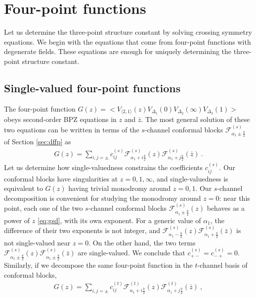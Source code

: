 \documentclass[12pt, a4paper]{article}
\theoremstyle{break}
\begin{document}
\section{Four-point functions}\label{sec:4pt}

Let us determine the three-point structure constant by solving crossing symmetry equations. We begin with the equations that come from four-point functions with degenerate fields. These equations are enough for uniquely determining the three-point structure constant.

\subsection{Single-valued four-point functions}

The four-point function $G(z) = \Big< V_{\langle 2, 1 \rangle}(z) V_{\Delta_1}(0)V_{\Delta_2}(\infty)V_{\Delta_3}(1) \Big>$ obeys second-order BPZ equations in $z$ and $\bar z$. The most general solution of these two equations can be written in terms of the $s$-channel conformal blocks $\mathcal{F}^{(s)}_{\alpha_1\pm\frac{b}{2}}$ of Section \ref{sec:dffp} as
\begin{align}
 G(z) = \sum_{i,j=\pm} c^{(s)}_{ij} \mathcal{F}^{(s)}_{\alpha_1+i\frac{b}{2}}(z) \mathcal{F}^{(s)}_{\alpha_1+j\frac{b}{2}}(\bar z)\ .
 \label{gzs}
\end{align}
Let us determine how single-valuedness constrains the coefficients $c^{(s)}_{ij}$. 
Our conformal blocks have singularities at $z=0,1,\infty$, and single-valuedness is equivalent to $G(z)$ having trivial monodromy around $z=0,1$. 
Our $s$-channel decomposition is convenient for studying the monodromy around $z=0$: near this point, each one of the two $s$-channel conformal blocks $\mathcal{F}^{(s)}_{\alpha_1\pm\frac{b}{2}}(z)$ behaves as a power of $z$ \eqref{eq:gsd}, with its own exponent. For a generic value of $\alpha_1$, the difference of their two exponents is not integer, and $\mathcal{F}^{(s)}_{\alpha_1-\frac{b}{2}}(z) \mathcal{F}^{(s)}_{\alpha_1+\frac{b}{2}}(\bar z)$ is not single-valued near $z=0$. On the other hand, the two terms $\mathcal{F}^{(s)}_{\alpha_1\pm\frac{b}{2}}(z) \mathcal{F}^{(s)}_{\alpha_1\pm\frac{b}{2}}(\bar z)$ are single-valued. We conclude that $c^{(s)}_{+-} = c^{(s)}_{-+}=0$. Similarly, if we decompose the same four-point function in the $t$-channel basis of conformal blocks,
\begin{align}
 G(z) = \sum_{i,j=\pm} c^{(t)}_{ij} \mathcal{F}^{(t)}_{\alpha_1+i\frac{b}{2}}(z) \mathcal{F}^{(t)}_{\alpha_1+j\frac{b}{2}}(\bar z)\ ,
\end{align}
\end{document}
